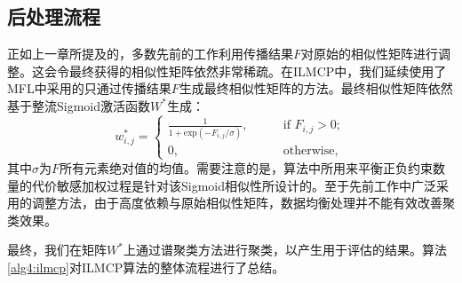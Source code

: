 \subsection{后处理流程}
\label{sec4:sigmoid}
正如上一章所提及的，多数先前的工作利用传播结果$F$对原始的相似性矩阵进行调整。这会令最终获得的相似性矩阵依然非常稀疏。在ILMCP中，我们延续使用了MFL中采用的只通过传播结果$F$生成最终相似性矩阵的方法。最终相似性矩阵依然基于整流Sigmoid激活函数$W^*$生成：
\begin{equation}
{w}^*_{i,j} = 
\begin{cases}
\frac{1}{1+\text{exp}(-{F}_{i,j}/\sigma)}, \qquad &\text{if }{F}_{i,j}>0;\\
0, &\text{otherwise, }
\end{cases}
\label{eq4:sig}
\end{equation}
其中$\sigma$为$F$所有元素绝对值的均值。需要注意的是，算法中所用来平衡正负约束数量的代价敏感加权过程是针对该Sigmoid相似性所设计的。至于先前工作中广泛采用的调整方法，由于高度依赖与原始相似性矩阵，数据均衡处理并不能有效改善聚类效果。

最终，我们在矩阵$W^*$上通过谱聚类方法进行聚类\cite{von2007tutorial}，以产生用于评估的结果。算法\ref{alg4:ilmcp}对ILMCP算法的整体流程进行了总结。

